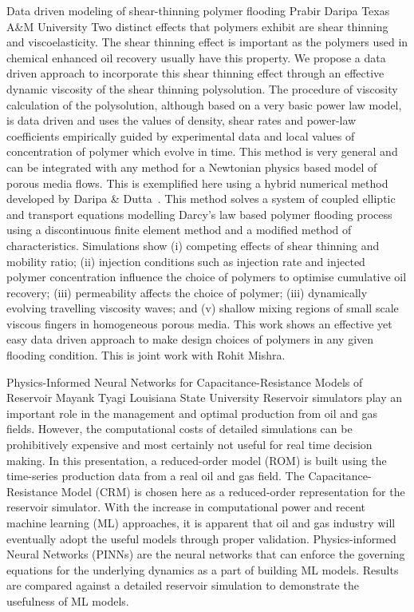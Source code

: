 \begin{addmargin}[2em]{0em}
\vspace{1.5ex}
\abs
{Data driven modeling of shear-thinning polymer flooding}
{Prabir Daripa}
{Texas A\&M University}
{Two distinct effects that polymers exhibit are shear thinning and viscoelasticity. The shear thinning effect is important as the polymers used in chemical enhanced oil recovery usually have this property. We propose a data driven approach to incorporate this shear thinning effect through an  effective dynamic viscosity of the shear thinning polysolution. The procedure of viscosity calculation of the polysolution, although based on a very basic power law model, is data driven and uses the values of density, shear rates and power-law coefficients empirically guided by experimental data and local values of concentration of polymer which evolve in time. This method is very general and can be integrated with any method for a Newtonian physics based model of porous media flows. This is exemplified here using a hybrid numerical method developed by Daripa \& Dutta~\cite{DFEMcode,daripa2017modeling,daripa2019convergence}. This method solves a system of coupled elliptic and transport equations modelling Darcy's law based polymer flooding process using a discontinuous finite element method and a modified method of characteristics. Simulations show (i) competing effects of shear thinning and mobility ratio; (ii) injection conditions such as injection rate and injected polymer concentration influence the choice of polymers to optimise cumulative oil recovery; (iii) permeability affects the choice of polymer; (iii) dynamically evolving travelling viscosity waves; and (v)  shallow mixing regions of small scale viscous fingers in homogeneous porous media. This work shows an effective yet easy data driven approach to make design choices of polymers in any given flooding condition. This is joint work with Rohit Mishra.}

\vspace{1.5ex}
\abs
{Physics-Informed Neural Networks for Capacitance-Resistance Models of Reservoir}
{Mayank Tyagi}
{Louisiana State University}
{Reservoir simulators play an important role in the management and optimal production from oil and gas fields. However, the computational costs of detailed simulations can be prohibitively expensive and most certainly not useful for real time decision making. In this presentation, a reduced-order model (ROM) is built using the time-series production data from a real oil and gas field. The Capacitance-Resistance Model (CRM) is chosen here as a reduced-order representation for the reservoir simulator. With the increase in computational power and recent machine learning (ML) approaches, it is apparent that oil and gas industry will eventually adopt the useful models through proper validation. Physics-informed Neural Networks (PINNs) are the neural networks that can enforce the governing equations for the underlying dynamics as a part of building ML models. Results are compared against a detailed reservoir simulation to demonstrate the usefulness of ML models.}



\end{addmargin}
